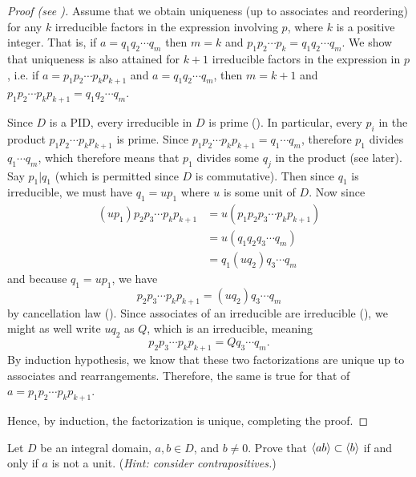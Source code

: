 \begin{proof}[Proof (see {\cite[Theorem 18.3]{gallian_2016}})]
    Assume that we obtain uniqueness (up to associates and reordering) for any $k$ irreducible factors in the expression involving $p$, where $k$ is a positive integer. That is, if $a = q_1q_2 \cdots q_m$ then $m = k$ and $p_1p_2\cdots p_k = q_1q_2 \cdots q_m$. We show that uniqueness is also attained for $k + 1$ irreducible factors in the expression in $p$, i.e. if $a = p_1p_2\cdots p_kp_{k+1}$ and $a = q_1q_2 \cdots q_m$, then $m = k+1$ and $p_1p_2\cdots p_kp_{k+1} = q_1q_2 \cdots q_m$.

    Since $D$ is a PID, every irreducible in $D$ is prime (). In particular, every $p_i$ in the product $p_1p_2\cdots p_kp_{k+1}$ is prime. Since $p_1p_2\cdots p_kp_{k+1} = q_1\cdots q_m$, therefore $p_1$ divides $q_1\cdots q_m$, which therefore means that $p_1$ divides some $q_j$ in the product (see  later). Say $p_1 \vert q_1$ (which is permitted since $D$ is commutative). Then since $q_1$ is irreducible, we must have $q_1 = up_1$ where $u$ is some unit of $D$. Now since
    \begin{align*}
        (up_1)p_2p_3\cdots p_kp_{k+1} &= u\left(p_1p_2p_3\cdots p_kp_{k+1}\right)\\
        &= u\left(q_1q_2q_3\cdots q_m\right)\\
        &= q_1(uq_2)q_3\cdots q_m
    \end{align*}
    and because $q_1 = up_1$, we have
    \[
        p_2p_3\cdots p_kp_{k+1} = (uq_2)q_3\cdots q_m
    \]
    by cancellation law (). Since associates of an irreducible are irreducible (), we might as well write $uq_2$ as $Q$, which is an irreducible, meaning
    \[
        p_2p_3\cdots p_kp_{k+1} = Qq_3\cdots q_m.
    \]
    By induction hypothesis, we know that these two factorizations are unique up to associates and rearrangements. Therefore, the same is true for that of $a = p_1p_2\cdots p_kp_{k+1}$.

    Hence, by induction, the factorization is unique, completing the proof.
\end{proof}

\begin{exercise}\label{exercise-princ-ab-subset-of-b-iff-a-not-unit}
    Let $D$ be an integral domain, $a,b\in D$, and $b \neq 0$. Prove that $\left\langle ab\right\rangle \subset \left\langle b\right\rangle$ if and only if $a$ is not a unit.\newline
    (\textit{Hint: consider contrapositives.})
\end{exercise}

